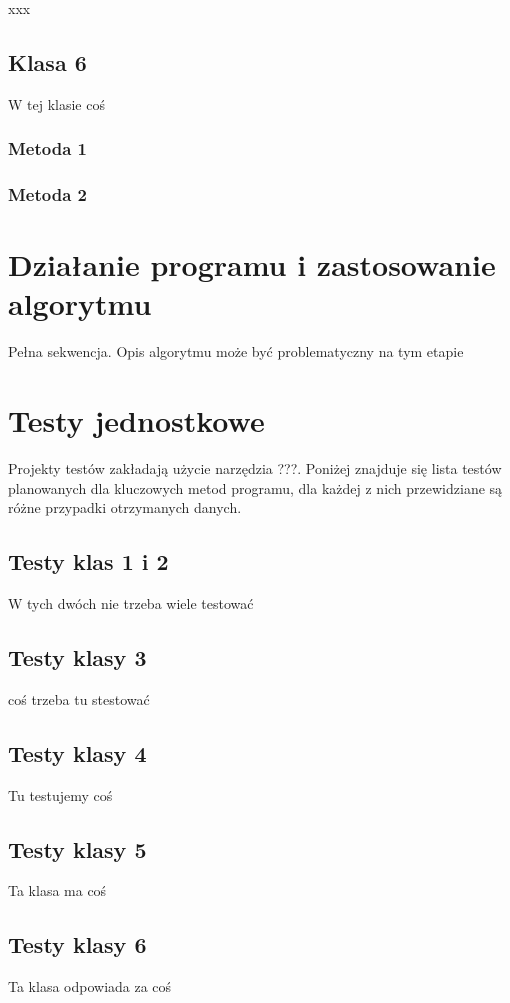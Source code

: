 \documentclass[a4paper,11pt]{article}
\newcommand\tab[1][0.6cm]{\hspace*{#1}}
\begin{document}
\tab xxx

\subsection{Klasa 6}

\tab W tej klasie coś

\subsubsection{Metoda 1}



\subsubsection{Metoda 2}



\section{Działanie programu i zastosowanie algorytmu}

\tab Pełna sekwencja. Opis algorytmu może być problematyczny na tym etapie

\section{Testy jednostkowe}

\tab Projekty testów zakładają użycie narzędzia ???. Poniżej znajduje się lista testów planowanych dla kluczowych metod programu, dla każdej z nich przewidziane są różne przypadki otrzymanych danych. 

\subsection{Testy klas 1 i 2}

\tab W tych dwóch nie trzeba wiele testować

\subsection{Testy klasy 3}

\tab coś trzeba tu stestować

\subsection{Testy klasy 4}

\tab Tu testujemy coś


\subsection{Testy klasy 5}

\tab Ta klasa ma coś

\subsection{Testy klasy 6}

\tab Ta klasa odpowiada za coś
\end{document}
